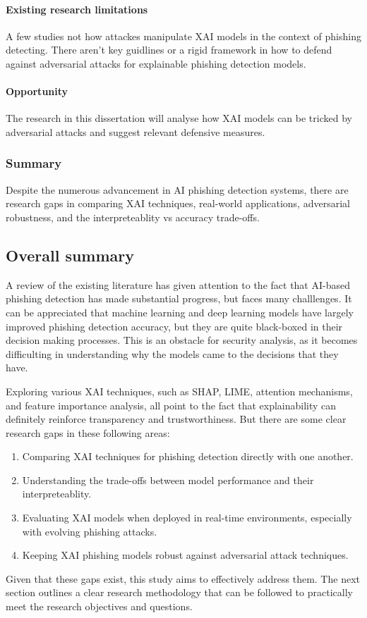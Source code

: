 \paragraph{Existing research limitations}
A few studies not how attackes manipulate XAI models in the context of phishing detecting. There aren't key guidlines or a rigid framework in how to defend against adversarial attacks for explainable phishing detection models.

\paragraph{Opportunity}
The research in this dissertation will analyse how XAI models can be tricked by adversarial attacks and suggest relevant defensive measures.

\subsubsection*{Summary}
Despite the numerous advancement in AI phishing detection systems, there are research gaps in comparing XAI techniques, real-world applications, adversarial robustness, and the interpreteablity vs accuracy trade-offs.

\newpage

\subsection*{Overall summary}
A review of the existing literature has given attention to the fact that AI-based phishing detection has made substantial progress, but faces many challlenges. It can be appreciated that machine learning and deep learning models have largely improved phishing detection accuracy, but they are quite black-boxed in their decision making processes. This is an obstacle for security analysis, as it becomes difficulting in understanding why the models came to the decisions that they have.\newline

\noindent Exploring various XAI techniques, such as SHAP, LIME, attention mechanisms, and feature importance analysis, all point to the fact that explainability can definitely reinforce transparency and trustworthiness. But there are some clear research gaps in these following areas:

\begin{enumerate}
  \item Comparing XAI techniques for phishing detection directly with one another.
  \item Understanding the trade-offs between model performance and their interpreteablity.
  \item Evaluating XAI models when deployed in real-time environments, especially with evolving phishing attacks.
  \item Keeping XAI phishing models robust against adversarial attack techniques.
\end{enumerate}

Given that these gaps exist, this study aims to effectively address them. The next section outlines a clear research methodology that can be followed to practically meet the research objectives and questions.

